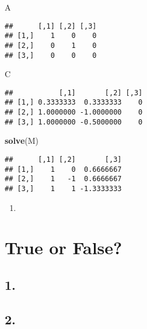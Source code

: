 \documentclass[]{article}
\newenvironment{Shaded}{\begin{snugshade}}{\end{snugshade}}
\newcommand{\KeywordTok}[1]{\textcolor[rgb]{0.12,0.11,0.11}{\textbf{#1}}}
\newcommand{\NormalTok}[1]{\textcolor[rgb]{0.12,0.11,0.11}{#1}}
\begin{document}
\begin{Shaded}
\begin{Highlighting}[]
\NormalTok{A}
\end{Highlighting}
\end{Shaded}

\begin{verbatim}
##      [,1] [,2] [,3]
## [1,]    1    0    0
## [2,]    0    1    0
## [3,]    0    0    0
\end{verbatim}

\begin{Shaded}
\begin{Highlighting}[]
\NormalTok{C}
\end{Highlighting}
\end{Shaded}

\begin{verbatim}
##           [,1]       [,2] [,3]
## [1,] 0.3333333  0.3333333    0
## [2,] 1.0000000 -1.0000000    0
## [3,] 1.0000000 -0.5000000    0
\end{verbatim}

\begin{Shaded}
\begin{Highlighting}[]
\KeywordTok{solve}\NormalTok{(M)}
\end{Highlighting}
\end{Shaded}

\begin{verbatim}
##      [,1] [,2]       [,3]
## [1,]    1    0  0.6666667
## [2,]    1   -1  0.6666667
## [3,]    1    1 -1.3333333
\end{verbatim}

\begin{enumerate}
\def\labelenumi{\alph{enumi}.}
\item
\end{enumerate}

\hypertarget{true-or-false}{%
\section{True or False?}\label{true-or-false}}

\hypertarget{section-121}{%
\subsection{1.}\label{section-121}}

\hypertarget{section-122}{%
\subsection{2.}\label{section-122}}
\end{document}

